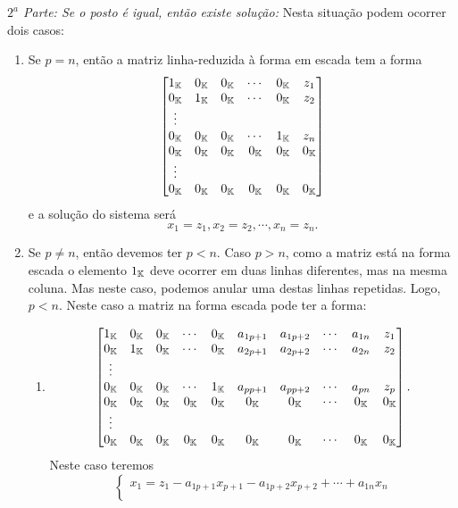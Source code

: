 \begin{prova}
\textit{$2^a$ Parte: Se o posto \'e igual, ent\~ao existe solu\c{c}\~ao:} Nesta situa\c{c}\~ao podem ocorrer dois casos:
\begin{enumerate}
	\item Se $p = n$, ent\~ao a matriz linha-reduzida \`a forma em escada tem a forma
	\[
	\begin{bmatrix}
	1_{\mathbb{K}} & 0_{\mathbb{K}} & 0_{\mathbb{K}} & \cdots & 0_{\mathbb{K}} & z_1\\
	0_{\mathbb{K}} & 1_{\mathbb{K}} & 0_{\mathbb{K}} & \cdots & 0_{\mathbb{K}} & z_2\\
	\vdots\\
	0_{\mathbb{K}} & 0_{\mathbb{K}} & 0_{\mathbb{K}} & \cdots & 1_{\mathbb{K}} & z_n\\
	0_{\mathbb{K}} & 0_{\mathbb{K}} & 0_{\mathbb{K}} & 0_{\mathbb{K}} & 0_{\mathbb{K}} & 0_{\mathbb{K}}\\
	\vdots\\
	0_{\mathbb{K}} & 0_{\mathbb{K}} & 0_{\mathbb{K}} & 0_{\mathbb{K}} & 0_{\mathbb{K}} & 0_{\mathbb{K}}
	\end{bmatrix}
	\]
	e a solu\c{c}\~ao do sistema ser\'a
	\[
	x_1 = z_1, x_2 = z_2, \cdots, x_n = z_n.
	\]
	\item Se $p \ne n$, ent\~ao devemos ter $p < n$. Caso $p > n$, como a matriz est\'a na forma escada o elemento $1_{\mathbb{K}}$ deve ocorrer em duas linhas diferentes, mas na mesma coluna. Mas neste caso, podemos anular uma destas linhas repetidas. Logo, $p < n$. Neste caso a matriz na forma escada pode ter a forma:
	\begin{enumerate}
		\item \[
		\begin{bmatrix}
		1_{\mathbb{K}} & 0_{\mathbb{K}} & 0_{\mathbb{K}} & \cdots & 0_{\mathbb{K}} & a_{1p+1} & a_{1p+2} & \cdots & a_{1n} & z_1\\
		0_{\mathbb{K}} & 1_{\mathbb{K}} & 0_{\mathbb{K}} & \cdots & 0_{\mathbb{K}} & a_{2p+1} & a_{2p+2} & \cdots & a_{2n} & z_2\\
		\vdots\\
		0_{\mathbb{K}} & 0_{\mathbb{K}} & 0_{\mathbb{K}} & \cdots & 1_{\mathbb{K}} & a_{pp+1} & a_{pp+2} & \cdots & a_{pn} & z_p\\
		0_{\mathbb{K}} & 0_{\mathbb{K}} & 0_{\mathbb{K}} & 0_{\mathbb{K}} & 0_{\mathbb{K}} & 0_{\mathbb{K}} & 0_{\mathbb{K}} & \cdots & 0_{\mathbb{K}} & 0_{\mathbb{K}}\\
		\vdots\\
		0_{\mathbb{K}} & 0_{\mathbb{K}} & 0_{\mathbb{K}} & 0_{\mathbb{K}} & 0_{\mathbb{K}} & 0_{\mathbb{K}} & 0_{\mathbb{K}} & \cdots & 0_{\mathbb{K}}  & 0_{\mathbb{K}}
		\end{bmatrix}.
		\]
		Neste caso teremos
		\[
		\begin{cases}
		x_1 = z_1 - a_{1 p + 1}x_{p + 1} - a_{1 p + 2}x_{p + 2} + \cdots + a_{1n}x_{n}\\

\end{cases}\]
\end{enumerate}
\end{enumerate}
\end{prova}
